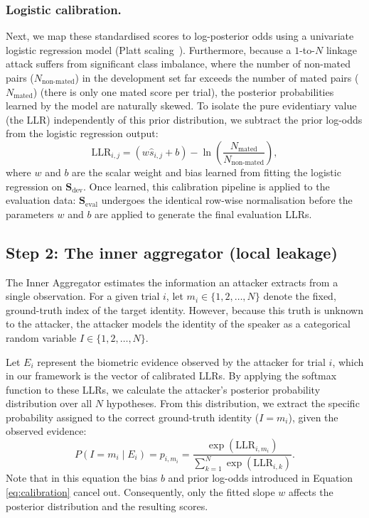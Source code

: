 \subsubsection{Logistic calibration.}
Next, we map these standardised scores to log-posterior odds using a univariate logistic regression model (Platt scaling~\cite{platt1999probabilistic}).
Furthermore, because a $1$-to-$N$ linkage attack suffers from significant class imbalance, where the number of non-mated pairs ($N_{\text{non-mated}}$) in the development set far exceeds the number of mated pairs ($N_{\text{mated}}$) (there is only one mated score per trial), the posterior probabilities learned by the model are naturally skewed. To isolate the pure evidentiary value (the LLR) independently of this prior distribution, we subtract the prior log-odds from the logistic regression output:
\begin{equation}\label{eq:calibration}
    \mathrm{LLR}_{i,j} = (w \hat{s}_{i,j} + b) - \ln\left(\frac{N_{\text{mated}}}{N_{\text{non-mated}}}\right),
\end{equation}
where $w$ and $b$ are the scalar weight and bias learned from fitting the logistic regression on $\mathbf{S}_{\text{dev}}$. Once learned, this calibration pipeline is applied to the evaluation data: $\mathbf{S}_{\text{eval}}$ undergoes the identical row-wise normalisation before the parameters $w$ and $b$ are applied to generate the final evaluation LLRs.

\subsection{Step 2: The inner aggregator (local leakage)}
\label{subsec:inner_aggregator}

The Inner Aggregator estimates the information an attacker extracts from a single observation. For a given trial $i$, let $m_i \in \{1, 2, \dots, N\}$ denote the fixed, ground-truth index of the target identity. However, because this truth is unknown to the attacker, the attacker models the identity of the speaker as a categorical random variable $I \in \{1, 2, \dots, N\}$.

Let $E_i$ represent the biometric evidence observed by the attacker for trial $i$, which in our framework is the vector of calibrated LLRs. By applying the softmax function to these LLRs, we calculate the attacker's posterior probability distribution over all $N$ hypotheses. From this distribution, we extract the specific probability assigned to the correct ground-truth identity ($I = m_i$), given the observed evidence:
\begin{equation}
    P(I = m_i \mid E_i) = p_{i, m_i} = \frac{\exp(\mathrm{LLR}_{i,m_i})}{\sum_{k=1}^N \exp(\mathrm{LLR}_{i,k})}.
\end{equation}
Note that in this equation the bias $b$ and prior log-odds introduced in Equation \ref{eq:calibration} cancel out. Consequently, only the fitted slope $w$ affects the posterior distribution and the resulting scores.


